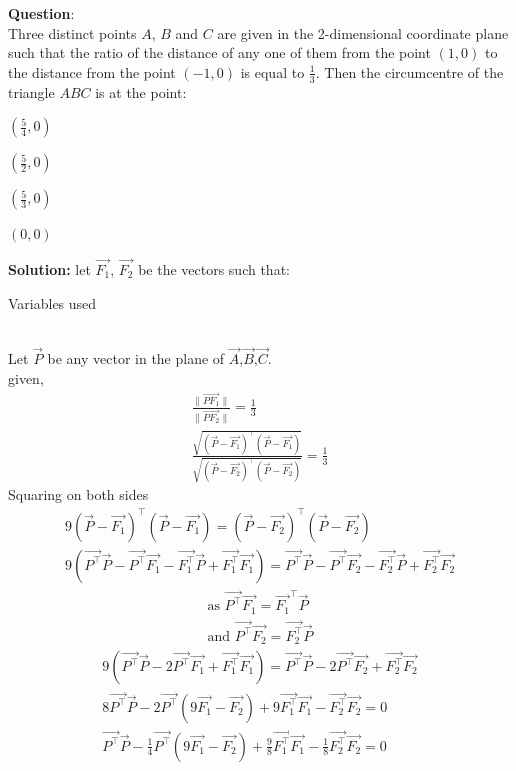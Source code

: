 \documentclass[journal]{IEEEtran}
\begin{document}
\textbf{Question}:\\
Three distinct points $A$, $B$ and $C$ are given in the 2-dimensional coordinate plane such that the ratio of the distance of any one of them from the point $(1,0)$ to the distance from the point $(-1,0)$ is equal to $\frac{1}{3}$. Then the circumcentre of the triangle $ABC$ is at the point:
\begin{enumerate}
\begin{multicols}{4}
\item $\left(\frac{5}{4}, 0\right)$
\item $\left(\frac{5}{2}, 0\right)$
\item $\left(\frac{5}{3}, 0\right)$
\item $(0, 0)$
\end{multicols}
\end{enumerate}
\textbf{Solution:}
let $\vec{F_1}$, $\vec{F_2}$ be the vectors such that:
\begin{table}[h!]
    \centering
    
    \caption{Variables used}
    \label{table 1.9.1}
\end{table}\\
Let $\vec{P}$ be any vector in the plane of $\vec{A}$,$\vec{B}$,$\vec{C}$.\\
  given,
\begin{align}
\frac{\| \vec{PF_1} \|}{\| \vec{PF_2} \|} = \frac{1}{3}\\
\frac{\sqrt{(\vec{P}-\vec{F_1})^\top (\vec{P}-\vec{F_1})}}{\sqrt{(\vec{P}-\vec{F_2})^\top (\vec{P}-\vec{F_2})}} = \frac{1}{3}
\end{align}
Squaring on both sides
\begin{align}
9 (\vec{P}-\vec{F_1})^\top (\vec{P}-\vec{F_1}) = (\vec{P}-\vec{F_2})^\top (\vec{P}-\vec{F_2})\\
9 (\vec{P^\top} \vec{P} - \vec{P^\top} \vec{F_1} - \vec{F_1^\top} \vec{P} + \vec{F_1^\top} \vec{F_1}) = \vec{P^\top} \vec{P} - \vec{P^\top} \vec{F_2} - \vec{F_2^\top} \vec{P} + \vec{F_2^\top} \vec{F_2}
\end{align}
\begin{align}
\text{as } \vec{P^\top} \vec{F_1} = \vec{F_1}^\top \vec{P} \\
\text{and } \vec{P^\top} \vec{F_2} = \vec{F_2^\top} \vec{P}
\end{align}
\begin{align}
9 (\vec{P^\top} \vec{P} - 2\vec{P^\top} \vec{F_1} + \vec{F_1^\top} \vec{F_1}) = \vec{P^\top} \vec{P} - 2\vec{P^\top} \vec{F_2} + \vec{F_2^\top} \vec{F_2}\\
8 \vec{P^\top} \vec{P} - 2\vec{P^\top} (9\vec{F_1}-\vec{F_2}) +9\vec{F_1^\top} \vec{F_1} - \vec{F_2^\top} \vec{F_2} = 0\\
\vec{P^\top} \vec{P} - \frac{1}{4} \vec{P^\top} (9\vec{F_1}-\vec{F_2}) + \frac{9}{8} \vec{F_1^\top} \vec{F_1} - \frac{1}{8} \vec{F_2^\top} \vec{F_2} = 0
\end{align}
\end{document}
